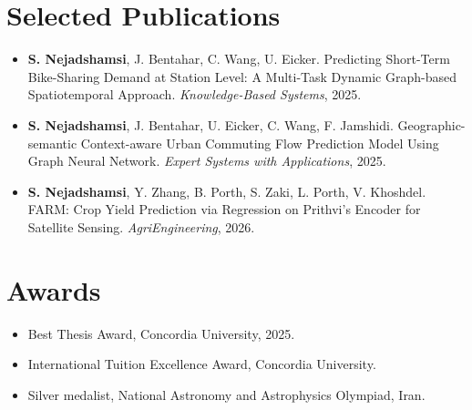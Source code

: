 \documentclass[11pt]{article}
\begin{document}
\section{Selected Publications}
\begin{itemize}
    \item \textbf{S. Nejadshamsi}, J. Bentahar, C. Wang, U. Eicker. Predicting Short-Term Bike-Sharing Demand at Station Level: A Multi-Task Dynamic Graph-based Spatiotemporal Approach. \emph{Knowledge-Based Systems}, 2025.
    \item \textbf{S. Nejadshamsi}, J. Bentahar, U. Eicker, C. Wang, F. Jamshidi. Geographic-semantic Context-aware Urban Commuting Flow Prediction Model Using Graph Neural Network. \emph{Expert Systems with Applications}, 2025.
    \item \textbf{S. Nejadshamsi}, Y. Zhang, B. Porth, S. Zaki, L. Porth, V. Khoshdel. FARM: Crop Yield Prediction via Regression on Prithvi's Encoder for Satellite Sensing. \emph{AgriEngineering}, 2026.
\end{itemize}

\section{Awards}
\begin{itemize}
    \item Best Thesis Award, Concordia University, 2025.
    \item International Tuition Excellence Award, Concordia University.
    \item Silver medalist, National Astronomy and Astrophysics Olympiad, Iran.
\end{itemize}
\end{document}
